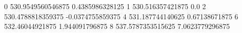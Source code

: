 0 530.9549560546875 0.4385986328125
1 530.516357421875 0.0
2 530.4788818359375 -0.0374755859375
4 531.187744140625 0.67138671875
6 532.46044921875 1.944091796875
8 537.5787353515625 7.0623779296875
